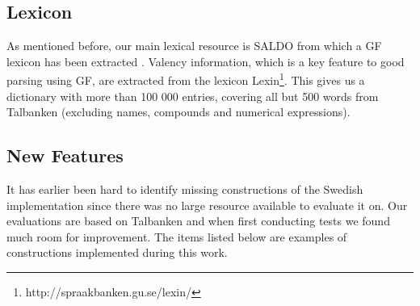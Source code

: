 \documentclass[runningheads,a4paper]{llncs}
\begin{document}
\subsection{Lexicon}

%
As mentioned before, our main lexical resource is SALDO \cite{saldo} from
which a GF lexicon has been extracted \cite{ahlbergEnache}.
Valency information, which is a key feature to good parsing using GF,
are extracted from the lexicon
Lexin\footnote{http://spraakbanken.gu.se/lexin/}.
This gives us a dictionary with more than 100 000 entries, covering all but 500
words from Talbanken (excluding names, compounds and numerical expressions).

\subsection{New Features}

%
%
%
%
%
It has earlier been hard to identify missing constructions of the Swedish
implementation since there was no large resource available to evaluate it on.
Our evaluations are based on Talbanken and when first conducting tests
 we found much room for improvement. The items listed below are examples
 of constructions implemented during this work.\\
\end{document}
